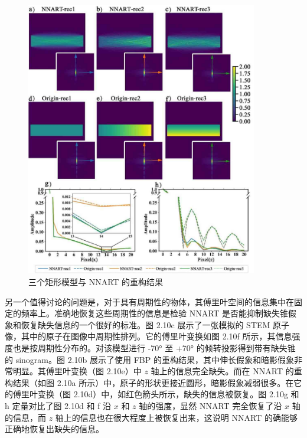 \begin{figure}[H]
	\vspace{\baselineskip}
	\centering
	\includegraphics[width=0.9\textwidth]{../3.15/315}
	\caption{三个矩形模型与 NNART 的重构结果}\label{fig:314}
	\song{}
\end{figure}

另一个值得讨论的问题是，对于具有周期性的物体，其傅里叶空间的信息集中在固定的频率上。准确地恢复这些周期性的信息是检验 NNART 是否能抑制缺失锥假象和恢复缺失信息的一个很好的标准。图 2.10c 展示了一张模拟的 STEM 原子像，其中的原子在图像中周期性排列。它的傅里叶变换如图 2.10f 所示，其信息强度也是按周期性分布的。对该模型进行 -70° 至 +70° 的倾转投影得到带有缺失锥的 sinogram。图 2.10b 展示了使用 FBP 的重构结果，其中伸长假象和暗影假象非常明显。其傅里叶变换（图 2.10e）中 $z$ 轴上的信息完全缺失。而在 NNART 的重构结果（如图 2.10a 所示）中，原子的形状更接近圆形，暗影假象减弱很多。在它的傅里叶变换（图 2.10d）中，如红色箭头所示，缺失的信息被恢复。图 2.10g 和 h 定量对比了图 2.10d 和 f 沿 $x$ 和 $z$ 轴的强度，显然 NNART 完全恢复了沿 $x$ 轴的信息，而 $z$ 轴上的信息也在很大程度上被恢复出来，这说明 NNART 的确能够正确地恢复出缺失的信息。

